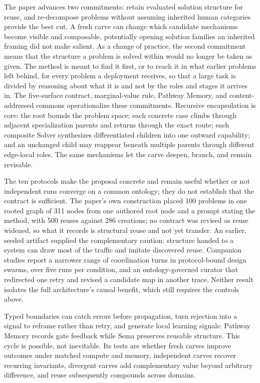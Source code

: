 \documentclass[11pt]{article}
\begin{document}
The paper advances two commitments: retain evaluated solution structure for reuse, and re-decompose problems without assuming inherited human categories provide the best cut. A fresh carve can change which candidate mechanisms become visible and composable, potentially opening solution families an inherited framing did not make salient. As a change of practice, the second commitment means that the structure a problem is solved within would no longer be taken as given. The method is meant to find it first, or to reach it in what earlier problems left behind, for every problem a deployment receives, so that a large task is divided by reasoning about what it is and not by the roles and stages it arrives in. The five-surface contract, marginal-value rule, Pathway Memory, and content-addressed commons operationalize these commitments. Recursive encapsulation is core: the root bounds the problem space; each concrete case climbs through adjacent specialization parents and returns through the exact route; each composite Solver synthesizes differentiated children into one outward capability; and an unchanged child may reappear beneath multiple parents through different edge-local roles. The same mechanisms let the carve deepen, branch, and remain revisable.

The ten protocols make the proposal concrete and remain useful whether or not independent runs converge on a common ontology; they do not establish that the contract is sufficient. The paper's own construction placed 100 problems in one rooted graph of 311 nodes from one authored root node and a prompt stating the method, with 500 reuses against 286 creations; no contract was revised as reuse widened, so what it records is structural reuse and not yet transfer. An earlier, seeded artifact supplied the complementary caution: structure handed to a system can draw most of the traffic and imitate discovered reuse. Companion studies report a narrower range of coordination turns in protocol-bound design swarms, over five runs per condition, and an ontology-governed curator that redirected one retry and revised a candidate map in another trace. Neither result isolates the full architecture's causal benefit, which still requires the controls above.

Typed boundaries can catch errors before propagation, turn rejection into a signal to reframe rather than retry, and generate local learning signals: Pathway Memory records gate feedback while Sema preserves reusable structure. This cycle is possible, not inevitable. Its tests are whether fresh carves improve outcomes under matched compute and memory, independent carves recover recurring invariants, divergent carves add complementary value beyond arbitrary difference, and reuse subsequently compounds across domains.
\end{document}
